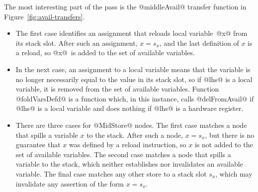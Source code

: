 \documentclass[blockstyle,preprint,nocopyrightspace]{sigplanconf}
\newcommand\slotof[1]{\ensuremath{s_{#1}}}
\let\slotOf=\slotof
\newcommand{\authornote}[1]{{\em #1}}
\def\authornote#1{\unskip\relax}
\newcommand{\simon}[1]{\authornote{SLPJ: #1}}
\newcommand{\norman}[1]{\authornote{NR: #1}}
\let\remark\norman
\def\finalremark#1{\relax}
\newcommand{\john}[1]{\authornote{JD: #1}}
\newcommand\figref[1]{Figure~\ref{fig:#1}}
\begin{document}
The most interesting part of the pass is the @middleAvail@ transfer
function in \figref{avail-transfers}.
\simon{Hang on!  We have not discussed the data type for middle or last nodes, 
yet they are essential to understand the code. This is a tough
one, because there is a fair amoutn to say.}
\begin{itemize}
\item
The first case \simon{``first case''/``second case'' is easier when writing than reading.  Could we
add @(Case 1)@ and @(Case 2)@ to the code we have an unambiguous URL?
\textbf{NR}: If we have time, we want line numbers in the code
figures.  John says it will be quick.} 
identifies an assignment that reloads local
variable~@x@ from its stack slot.\finalremark{I propose the compiler be
modified to use @isStackSlotOf@ as I've written. JD~approves.}
After such an assignment, $x = \slotof x$,
and the last definition of $x$ is a reload,
so @x@~is added to the set of available variables.
\item
In the next case, an assignment to a local variable means that the
variable is no longer necessarily equal to the value in its stack
slot, so if @lhs@ is a local variable, it is removed from the set of
available variables.
Function @foldVarsDefd@ is a function which, in this
instance, calls @delFromAvail@ if @lhs@ is a local variable and does
nothing if @lhs@ is a hardware register.
\remark{To Simon and John: I've removed ``overloaded but am a bit nervous
because @foldVarsDef@ shows up as overloaded later in the paper, and I
had thought to signpost it here.  Your thoughts?}
\item 
There are three cases for @MidStore@ nodes.
The first case matches a node that spills a variable $x$ to the stack.
After such a node, $x = \slotOf x$,
but there is no guarantee that $x$ was defined by a reload instruction,
so $x$ is not added to the set of available variables.
The second case matches a node that spills a variable to the stack,
which neither establishes nor invalidates an available variable.
The final case matches any other store to a stack slot $\slotof x$,
which may invalidate any assertion of the form $x = \slotof x$.



\end{itemize}
\end{document}
